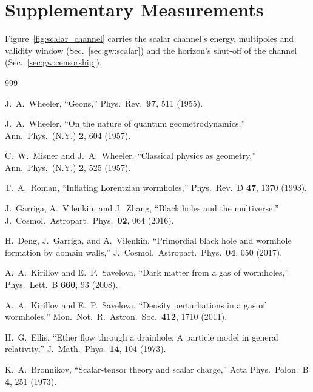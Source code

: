 \documentclass[twocolumn,floatfix,aps,prd,superscriptaddress,nofootinbib]{revtex4-2}
\begin{document}
\section{Supplementary Measurements}
\label{app:supp}

Figure~\ref{fig:scalar_channel} carries the scalar channel's energy, multipoles and validity window (Sec.~\ref{sec:gw:scalar}) and the horizon's shut-off of the channel (Sec.~\ref{sec:gw:censorship}).

\FloatBarrier

\begin{thebibliography}{999}

J.~A.~Wheeler,
\newblock ``Geons,''
\newblock Phys.\ Rev.\ \textbf{97}, 511 (1955).

J.~A.~Wheeler,
\newblock ``On the nature of quantum geometrodynamics,''
\newblock Ann.\ Phys.\ (N.Y.) \textbf{2}, 604 (1957).

C.~W.~Misner and J.~A.~Wheeler,
\newblock ``Classical physics as geometry,''
\newblock Ann.\ Phys.\ (N.Y.) \textbf{2}, 525 (1957).

T.~A.~Roman,
\newblock ``Inflating Lorentzian wormholes,''
\newblock Phys.\ Rev.\ D \textbf{47}, 1370 (1993).

J.~Garriga, A.~Vilenkin, and J.~Zhang,
\newblock ``Black holes and the multiverse,''
\newblock J.\ Cosmol.\ Astropart.\ Phys.\ \textbf{02}, 064 (2016).

H.~Deng, J.~Garriga, and A.~Vilenkin,
\newblock ``Primordial black hole and wormhole formation by domain walls,''
\newblock J.\ Cosmol.\ Astropart.\ Phys.\ \textbf{04}, 050 (2017).

A.~A.~Kirillov and E.~P.~Savelova,
\newblock ``Dark matter from a gas of wormholes,''
\newblock Phys.\ Lett.\ B \textbf{660}, 93 (2008).

A.~A.~Kirillov and E.~P.~Savelova,
\newblock ``Density perturbations in a gas of wormholes,''
\newblock Mon.\ Not.\ R.\ Astron.\ Soc.\ \textbf{412}, 1710 (2011).

H.~G.~Ellis,
\newblock ``Ether flow through a drainhole: A particle model in general relativity,''
\newblock J.\ Math.\ Phys.\ \textbf{14}, 104 (1973).

K.~A.~Bronnikov,
\newblock ``Scalar-tensor theory and scalar charge,''
\newblock Acta Phys.\ Polon.\ B \textbf{4}, 251 (1973).


\end{thebibliography}
\end{document}
